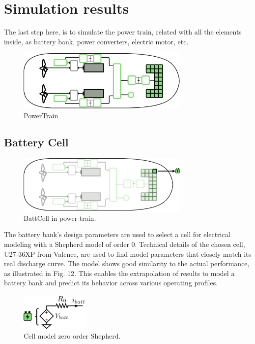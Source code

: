 \chapter{Simulation results}

The last step here, is to simulate the power train, related with all the elements inside, as battery bank, power converters, electric motor, etc.

\begin{figure}[h]
    \centering
    \includegraphics[width=0.75\textwidth]{images/chapter05/PowerTrain.jpg}
    \caption{PowerTrain}
    \label{PowerTrain}
\end{figure}

\section{Battery Cell}

\begin{figure}[h]
    \centering
    \includegraphics[width=0.75\textwidth]{images/chapter05/01_BattCell/BattCell_scheme.jpg}
    \caption{BattCell in power train.}
    \label{BattCell}
\end{figure}

The battery bank’s design parameters are used to select a cell for electrical modeling with a Shepherd model of order 0. Technical details of the chosen cell, U27-36XP from Valence, are used to find model parameters that closely match its real discharge curve. The model shows good similarity to the actual performance, as illustrated in Fig. 12. This enables the extrapolation of results to model a battery bank and predict its behavior across various operating profiles.

\begin{figure}[h]
    \centering
    \includegraphics[width=0.3\textwidth]{images/chapter05//01_BattCell/Cell_model.jpg}
    \caption{Cell model zero order Shepherd.}
    \label{fig:Zo_Shepherd}
\end{figure}

